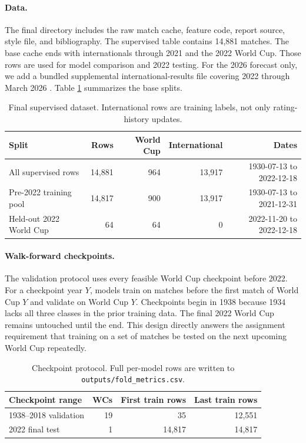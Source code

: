 \documentclass{article}
\begin{document}
\paragraph{Data.}
The final directory includes the raw match cache, feature code, report source,
style file, and bibliography. The supervised table contains 14,881 matches.
The base cache ends with internationals through 2021 and the 2022 World Cup.
Those rows are used for model comparison and 2022 testing. For the 2026
forecast only, we add a bundled supplemental international-results file
covering 2022 through March 2026 \citep{martj42international}. Table
\ref{tab:data} summarizes the base splits.

\begin{table}[ht]
\centering
\small
\caption{Final supervised dataset. International rows are training labels, not
only rating-history updates.}
\label{tab:data}
\begin{tabular}{lrrrr}
\toprule
Split & Rows & World Cup & International & Dates \\
\midrule
All supervised rows & 14,881 & 964 & 13,917 & 1930-07-13 to 2022-12-18 \\
Pre-2022 training pool & 14,817 & 900 & 13,917 & 1930-07-13 to 2021-12-31 \\
Held-out 2022 World Cup & 64 & 64 & 0 & 2022-11-20 to 2022-12-18 \\
\bottomrule
\end{tabular}
\end{table}

\paragraph{Walk-forward checkpoints.}
The validation protocol uses every feasible World Cup checkpoint before 2022.
For a checkpoint year $Y$, models train on matches before the first
match of World Cup $Y$ and validate on World Cup $Y$. Checkpoints begin in
1938 because 1934 lacks all three classes in the prior training data. The
final 2022 World Cup remains untouched until the end. This design directly
answers the assignment requirement that training on a set of matches be
tested on the next upcoming World Cup repeatedly.

\begin{table}[ht]
\centering
\small
\caption{Checkpoint protocol. Full per-model rows are written to
\texttt{outputs/fold\_metrics.csv}.}
\label{tab:folds}
\begin{tabular}{lrrr}
\toprule
Checkpoint range & WCs & First train rows & Last train rows \\
\midrule
1938--2018 validation & 19 & 35 & 12,551 \\
2022 final test & 1 & 14,817 & 14,817 \\
\bottomrule
\end{tabular}
\end{table}
\end{document}
